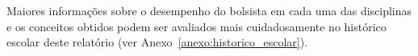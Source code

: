 Maiores informações sobre o desempenho do bolsista em cada uma das disciplinas e os conceitos obtidos podem ser avaliados mais cuidadosamente no histórico escolar deste relatório (ver Anexo~\ref{anexo:historico_escolar}).

